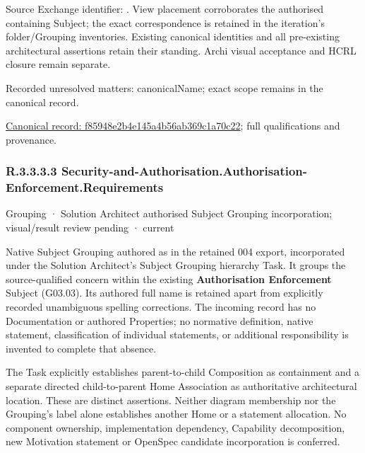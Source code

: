 Source Exchange identifier: \texttt{}. View placement corroborates
the authorised containing Subject; the exact correspondence is retained in the
iteration's folder/Grouping inventories. Existing canonical identities and all
pre-existing architectural assertions retain their standing. Archi visual
acceptance and HCRL closure remain separate.


{\small Recorded unresolved matters: canonicalName; exact scope remains in the canonical record.}\par
{\footnotesize \href{../../../../continuum/grouping/f85948e2b4e145a4b56ab369c1a70c22.md}{Canonical record: f85948e2b4e145a4b56ab369c1a70c22}; full qualifications and provenance.}\par
\subsubsection*{R.3.3.3.3 Security-and-Authorisation.Authorisation-Enforcement.Requirements}
\label{navigation:R.3.3.3.3}

\label{element:9a5487f0dd7b42bca1f791aad1257849}
{\small Grouping · Solution Architect authorised Subject Grouping incorporation; visual/result review pending · current}\par

Native Subject Grouping authored as \texttt{} in the retained 004 export,
incorporated under the Solution Architect's Subject Grouping hierarchy Task.
It groups the source-qualified \texttt{} concern within
the existing \textbf{Authorisation Enforcement} Subject (G03.03). Its authored full name
is retained apart from explicitly recorded unambiguous spelling corrections.
The incoming record has no Documentation or authored Properties; no normative
definition, native statement, classification of individual statements, or
additional responsibility is invented to complete that absence.



The Task explicitly establishes parent-to-child Composition as containment and
a separate directed child-to-parent Home Association as authoritative architectural
location. These are distinct assertions. Neither diagram membership nor the
Grouping's label alone establishes another Home or a statement allocation.
No component ownership, implementation dependency, Capability decomposition,
new Motivation statement or OpenSpec candidate incorporation is conferred.



